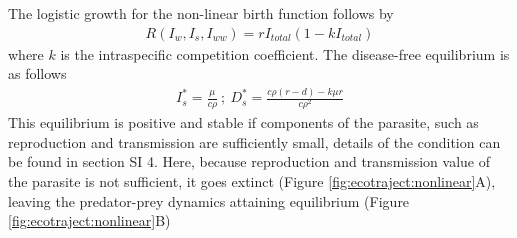 \documentclass[a4paper]{scrartcl}
\begin{document}
The logistic growth for the non-linear birth function follows by 
%
\begin{align*}
R(I_w, I_s,I_{ww}) = r I_{total} (1 - k I_{total})
\end{align*}
%
where $k$ is the intraspecific competition coefficient. 
The disease-free equilibrium is as follows
%
\begin{align*}
I_s^* = \frac{\mu}{c \rho } \ ;\  D_s^* = \frac{c \rho  (r-d) - k \mu  r}{c \rho ^2}
\end{align*}
%
This equilibrium is positive and stable if components of the parasite, such as reproduction and transmission are sufficiently small, details of the condition can be found in section SI 4. Here, because reproduction and transmission value of the parasite is not sufficient, it goes extinct (Figure \ref{fig:ecotraject:nonlinear}A), leaving the predator-prey dynamics attaining equilibrium (Figure \ref{fig:ecotraject:nonlinear}B)
\end{document}
